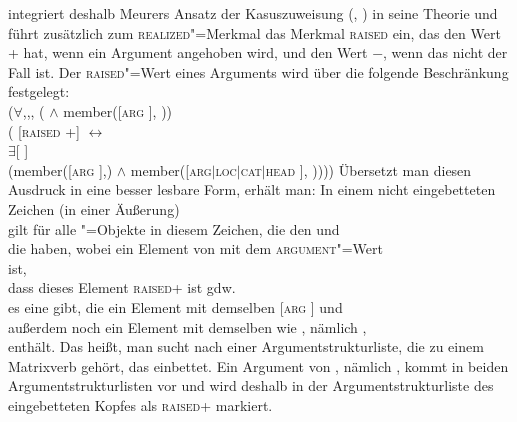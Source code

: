 \citet{Prze99b} integriert deshalb Meurers Ansatz der Kasuszuweisung (\citeyear{Meurers99b}, \citeyear[Kapitel~10.4.1.4]{Meurers2000b})
in seine Theorie und führt zusätzlich zum \textsc{realized}"=Merkmal
das Merkmal \textsc{raised} ein, das den Wert + hat, wenn ein
Argument angehoben wird, und den Wert $-$, wenn das nicht der Fall ist.
Der \textsc{raised}"=Wert eines Arguments wird über die folgende Beschränkung
festgelegt:
\ea
\label{raised-wert}
 \impl\\
\mbox{}\hspace{3ex}($\forall$,,, (  $\wedge$ member([\textsc{arg}  ], )) \impl\\
\mbox{}\hspace{6ex}( [\textsc{raised} +] $\leftrightarrow$\\
\mbox{}\hspace{9ex}$\exists$[\argst {} ]\\
\mbox{}\hspace{9ex}(member([\textsc{arg}  ],) $\wedge$ member([\textsc{arg$|$loc$|$cat$|$head}  ], ))))
\z
Übersetzt man diesen Ausdruck in eine besser lesbare Form, erhält man:
\ea
In einem nicht eingebetteten Zeichen (\dash in einer Äußerung)\\
\mbox{}\hspace{3ex}gilt für alle "=Objekte in diesem Zeichen, die den \headw {} und\\
\mbox{}\hspace{3ex}die \argst {} haben, wobei  ein Element von  mit dem
     \textsc{argument}"=Wert \\
\mbox{}\hspace{3ex}ist,\\
\mbox{}\hspace{3ex}dass dieses Element  \textsc{raised}+ ist gdw.\ \\
\mbox{}\hspace{6ex}es eine \argstl gibt, die ein Element mit demselben [\textsc{arg}  ] und\\
\mbox{}\hspace{6ex}außerdem noch ein Element mit demselben \headw wie , nämlich ,\\
\mbox{}\hspace{6ex}enthält.
\z
Das heißt, man sucht nach einer Argumentstrukturliste, die zu einem Matrixverb gehört, das
 einbettet. Ein Argument von , nämlich , kommt in beiden Argumentstrukturlisten
vor und wird deshalb in der Argumentstrukturliste des eingebetteten Kopfes als \textsc{raised}+
markiert.

